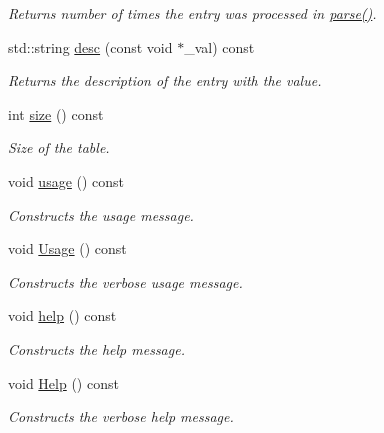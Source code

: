 \begin{DoxyCompactItemize}
\begin{DoxyCompactList}\small\item\em Returns number of times the entry was processed in \hyperlink{classpoptmx_1_1OptionTable_a78951c617d55e45178697d7eca9e0b67}{parse()}. \item\end{DoxyCompactList}\item 
std::string \hyperlink{classpoptmx_1_1OptionTable_a0a66ac0e3297c36f516ff4d70ed04a80}{desc} (const void $\ast$\_\-val) const 
\begin{DoxyCompactList}\small\item\em Returns the description of the entry with the value. \item\end{DoxyCompactList}\item 
int \hyperlink{classpoptmx_1_1OptionTable_a804d3d1816612400a102e9dda416197a}{size} () const 
\begin{DoxyCompactList}\small\item\em Size of the table. \item\end{DoxyCompactList}\item 
void \hyperlink{classpoptmx_1_1OptionTable_ad3c31971fa1e2e061e06e7372c050477}{usage} () const 
\begin{DoxyCompactList}\small\item\em Constructs the usage message. \item\end{DoxyCompactList}\item 
void \hyperlink{classpoptmx_1_1OptionTable_a98d1089187037b02e5d2cee333895229}{Usage} () const 
\begin{DoxyCompactList}\small\item\em Constructs the verbose usage message. \item\end{DoxyCompactList}\item 
void \hyperlink{classpoptmx_1_1OptionTable_a26c611c325ce223bd90affc1b6841c3d}{help} () const 
\begin{DoxyCompactList}\small\item\em Constructs the help message. \item\end{DoxyCompactList}\item 
void \hyperlink{classpoptmx_1_1OptionTable_a00834062b060e732ae72bc3883c55ca1}{Help} () const 
\begin{DoxyCompactList}\small\item\em Constructs the verbose help message. \item\end{DoxyCompactList}\item 

\end{DoxyCompactItemize}

